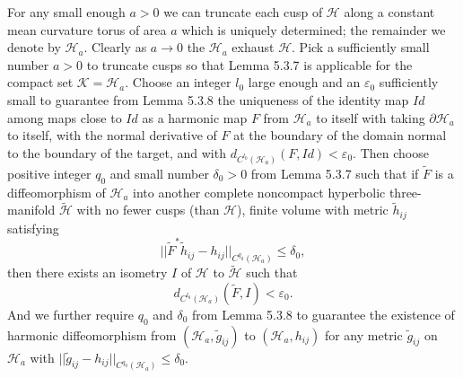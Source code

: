 For any small enough $a>0$ we can truncate each cusp of
$\mathcal{H}$ along a constant mean curvature torus of area $a$
which is uniquely determined; the remainder we denote by
$\mathcal{H}_a$. Clearly as $a\rightarrow 0$ the $\mathcal{H}_a$
exhaust $\mathcal{H}$. Pick a sufficiently small number $a>0$ to
truncate cusps so that Lemma 5.3.7 is applicable for the compact
set $\mathcal{K} = \mathcal{H}_a$. Choose an integer $l_0$ large
enough and an $\varepsilon_0$ sufficiently small to guarantee from
Lemma 5.3.8 the uniqueness of the identity map $Id$ among maps
close to $Id$ as a harmonic map $F$ from $\mathcal{H}_a$ to itself
with taking $\partial\mathcal{H}_a$ to itself, with the normal
derivative of $F$ at the boundary of the domain normal to the
boundary of the target, and with $d_{C^{l_0}(\mathcal{H}_a)}(F,Id)
< \varepsilon_0$. Then choose positive integer $q_0$ and small
number $\delta_0>0$ from Lemma 5.3.7 such that if $\tilde{F}$ is a
diffeomorphism of $\mathcal{H}_a$ into another complete noncompact
hyperbolic three-manifold $\tilde{\mathcal{H}}$ with no fewer
cusps (than $\mathcal{H}$), finite volume with metric
$\tilde{h}_{ij}$ satisfying
$$
||\tilde{F}^*\tilde{h}_{ij}-h_{ij}||_{C^{q_0}(\mathcal{H}_a)} \le
\delta_0,
$$
then there exists an isometry $I$ of $\mathcal{H}$ to
$\tilde{\mathcal{H}}$ such that \begin{equation}
d_{C^{l_0}(\mathcal{H}_a)}(\tilde{F},I)<\varepsilon_0. %
\end{equation} And we further require $q_0$ and $\delta_0$ from Lemma 5.3.8
to guarantee the existence of harmonic diffeomorphism from
$(\mathcal{H}_a,\tilde{g}_{ij})$ to $(\mathcal{H}_a,h_{ij})$ for
any metric $\tilde{g}_{ij}$ on $\mathcal{H}_a$ with
$||\tilde{g}_{ij}-h_{ij}||_{C^{q_0}(\mathcal{H}_a)}\le\delta_0.$

